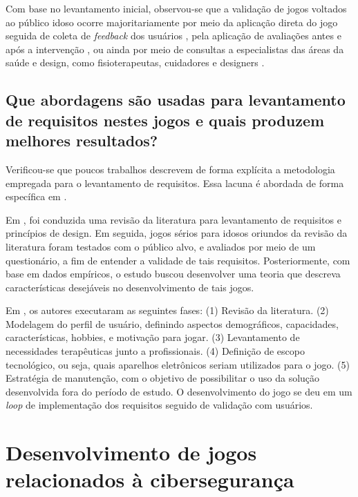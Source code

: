 Com base no levantamento inicial, observou-se que a validação de jogos voltados ao público idoso ocorre majoritariamente por meio da aplicação direta do jogo seguida de coleta de \textit{feedback} dos usuários \cite{merilampi2017cognitive}, pela aplicação de avaliações antes e após a intervenção \cite{wong2022effectiveness}, ou ainda por meio de consultas a especialistas das áreas da saúde e design, como fisioterapeutas, cuidadores e designers \cite{busca2024serious}.

\subsection{Que abordagens são usadas para levantamento de requisitos nestes jogos e quais produzem melhores resultados?}\label{subsec:qp3}

Verificou-se que poucos trabalhos descrevem de forma explícita a metodologia empregada para o levantamento de requisitos. Essa lacuna é abordada de forma específica em \cite{machado2018heuristics, manser2021making}.

Em \cite{machado2018heuristics}, foi conduzida uma revisão da literatura para levantamento de requisitos e princípios de design. Em seguida, jogos sérios para idosos oriundos da revisão da literatura foram testados com o público alvo, e avaliados por meio de um questionário, a fim de entender a validade de tais requisitos. Posteriormente, com base em dados empíricos, o estudo buscou desenvolver uma teoria que descreva características desejáveis no desenvolvimento de tais jogos.

Em \cite{manser2021making}, os autores executaram as seguintes fases: (1) Revisão da literatura. (2) Modelagem do perfil de usuário, definindo aspectos demográficos, capacidades, características, hobbies, e motivação para jogar. (3) Levantamento de necessidades terapêuticas junto a profissionais. (4) Definição de escopo tecnológico, ou seja, quais aparelhos eletrônicos seriam utilizados para o jogo. (5) Estratégia de manutenção, com o objetivo de possibilitar o uso da solução desenvolvida fora do período de estudo. O desenvolvimento do jogo se deu em um \textit{loop} de implementação dos requisitos seguido de validação com usuários.

\section{Desenvolvimento de jogos relacionados à cibersegurança}\label{sec:ciberseguranca}

